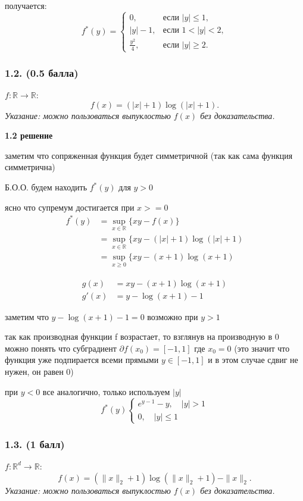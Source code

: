 \documentclass[12pt]{article}
\begin{document}
получается:
$$
f^*(y) = 
\begin{cases} 
0, & \text{если } |y| \leq 1, \\
|y| - 1, & \text{если } 1 < |y| < 2, \\
\frac{y^2}{4}, & \text{если } |y| \geq 2.
\end{cases}
$$

\subsubsection*{1.2. (0.5 балла)}
$ f : \mathbb{R} \to \mathbb{R} $: 
$$
f(x) = (|x| + 1) \log(|x| + 1).
$$
\textit{Указание: можно пользоваться выпуклостью $ f(x) $ без доказательства.}

\textbf{1.2 решение}

заметим что сопряженная функция будет симметричной (так как сама функция симметрична)

Б.О.О. будем находить $f^*(y)$ для $y > 0$

ясно что супремум достигается при $x>=0$ 
$$
\begin{aligned}
    f^*(y)
    &= \sup_{x \in \mathbb{R}} \{ x y - f(x) \} \\
    &= \sup_{x \in \mathbb{R}} \{ x y - (|x| + 1) \log(|x| + 1) \\
    &= \sup_{x \geq 0} \{ x y - (x + 1) \log(x + 1)
\end{aligned}
$$

$$
\begin{aligned}
    g(x) &= x y - (x + 1) \log(x + 1) \\
    g'(x) &= y - \log(x + 1) - 1
\end{aligned}
$$

заметим что $y - \log(x + 1) - 1  =0$ возможно при $y > 1$

так как производная функции f возрастает, то взглянув на производную в 0 можно понять что субградиент $\partial f(x_0) = [-1, 1]$ где $x_0 = 0$ (это значит что функция уже подпирается всеми прямыми $y \in [-1, 1]$ и в этом случае сдвиг не нужен, он равен 0)

при $y < 0$ все аналогично, только используем $|y|$
$$
f^*(y)
\begin{cases}
    e^{y-1} - y, \quad |y| > 1 \\
    0, \quad |y| \leq 1
\end{cases}
$$



\subsubsection*{1.3. (1 балл)}
$ f : \mathbb{R}^d \to \mathbb{R} $: 
$$
f(x) = (\|x\|_2 + 1) \log(\|x\|_2 + 1) - \|x\|_2.
$$
\textit{Указание: можно пользоваться выпуклостью $ f(x) $ без доказательства.}
\end{document}
